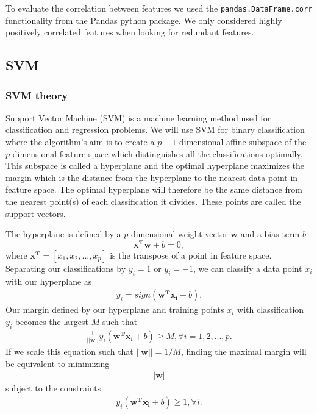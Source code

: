 To evaluate the correlation between features we used the 
\verb|pandas.DataFrame.corr| functionality from the Pandas python package. We
only considered highly positively correlated features when looking for
redundant features.   

















\subsection{SVM}
\label{sec:SVM}
\subsubsection{SVM theory}
\label{sec:SVM_theory}
Support Vector Machine (SVM) is a machine learning method used for 
classification and regression problems. We will use SVM for binary 
classification where the algorithm's aim is to create a $p-1$ dimensional
affine subspace of the $p$ dimensional feature space which distinguishes all the 
classifications optimally. This subspace is called a hyperplane and the 
optimal hyperplane maximizes the margin which is the distance from the 
hyperplane to the nearest data point in feature space. The optimal hyperplane 
will therefore be the same distance from the nearest point(s) of each 
classification it divides. These points are called the support vectors.

The hyperplane is defined by a $p$ dimensional weight vector $\boldsymbol{w}$ and a 
bias term $b$ \cite{w46}
\begin{equation}
\boldsymbol{x^T}\boldsymbol{w} + b =0, 
\label{eq:hyperplane}
\end{equation}
where $\boldsymbol{x^T}=[x_1,x_2,...,x_p]$ is the transpose of a point in feature space.
Separating our classifications by $y_i=1$ or $y_i=-1$, we can classify a 
data point $x_i$ with our hyperplane as 
\begin{gather*}
y_i = sign(\boldsymbol{w^T}\boldsymbol{x_i}+b). 
\end{gather*}
Our margin defined by our hyperplane and training points $x_i$ with classification $y_i$ becomes the largest $M$ such that 
\begin{gather}
\frac{1}{||\boldsymbol{w}||}y_i(\boldsymbol{w^Tx_i}+b) \ge M, \forall i=1,2,...,p. 
\end{gather}
If we scale this equation such that $||\boldsymbol{w}||=1/M$, finding the maximal margin 
will be equivalent to minimizing 
\begin{gather*}
||\boldsymbol{w}||
\end{gather*}
subject to the constraints 
\begin{gather*}
y_i(\boldsymbol{w^Tx_i}+b) \ge 1, \forall i.
\end{gather*}

